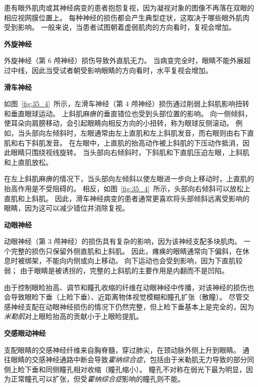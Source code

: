 \begin{proposition}[眼外肌肉或神经损伤] \label{box:35_1}

\quad \quad 患有眼外肌肉或其神经病变的患者抱怨复视，因为凝视对象的图像不再落在双眼的相应视网膜位置上。
每种神经的损伤都会产生典型症状，这取决于哪些眼外肌肉受到影响。
一般来说，当患者试图朝着虚弱肌肉的方向看时，复视会增加。


\textbf{外旋神经}

\quad \quad 外旋神经（第 6 颅神经）损伤导致外直肌无力。
当病变完全时，眼睛不能外展超过中线，因此当受试者朝受影响眼睛的方向看时，水平复视会增加。


\textbf{滑车神经}

\quad \quad 如图~\ref{fig:35_4}~所示，左滑车神经（第 4 颅神经）损伤通过削弱上斜肌影响扭转和垂直眼球运动。
上斜肌麻痹的垂直错位也受到头部位置的影响。
向一侧倾斜，使耳朵向肩膀移动，会引起眼睛向相反方向的小扭转，称为眼球反侧滚动。
例如，当头部向左倾斜时，左眼通常由左上直肌和左上斜肌发音，而右眼则由右下直肌和右下斜肌发音。
在左眼中，上直肌的抬高动作被上斜肌的下压动作抵消，因此眼睛只围绕视线旋转。
当头部向右倾斜时，下斜肌和下直肌压迫左眼，上斜肌和上直肌放松。


\quad \quad 在左上斜肌麻痹的情况下，当头部向左倾斜以使左眼进一步向上移动时，上直肌的抬高作用是不受阻碍的。
相反，如图~\ref{fig:35_4}~所示，头部向右倾斜可以放松上直肌和上斜肌。
因此，滑车神经病变的患者通常更喜欢将头部倾斜远离受影响的眼睛，因为这可以减少错位并消除复视。


\textbf{动眼神经}

\quad \quad 动眼神经（第 3 颅神经）的损伤具有复杂的影响，因为该神经支配多块肌肉。
一个完整的损伤只保留外侧直肌和上斜肌。
因此，瘫痪的眼睛通常向下偏斜，在休息时被绑架，不能向内侧或向上移动。
向下运动也会受到影响，因为下直肌较弱；
由于眼睛是被诱拐的，完整的上斜肌的主要作用是内翻而不是凹陷。


\quad \quad 由于控制眼睑抬高、调节和瞳孔收缩的纤维在动眼神经中传播，对该神经的损伤也会导致眼睑下垂（上睑下垂）、近距离物体视觉模糊和瞳孔扩张（散瞳）。
尽管交感神经支配在动眼神经损伤的情况下仍然完整，但上睑下垂基本上是完全的，因为\textit{米勒肌}对上眼睑抬高的贡献小于上眼睑提肌。


\textbf{交感眼动神经}

\quad \quad 支配眼睛的交感神经纤维来自胸脊髓，穿过肺尖，在颈动脉外侧上升到眼睛。
通往眼睛的交感神经通路中断会导致\textit{霍纳综合症}，包括由于米勒肌无力导致的部分同侧上睑下垂和同侧瞳孔相对收缩（瞳孔缩小）。
瞳孔不对称在弱光下最为明显，因为正常瞳孔可以扩张，但受\textit{霍纳综合症}影响的瞳孔则不能。
	
\end{proposition}


